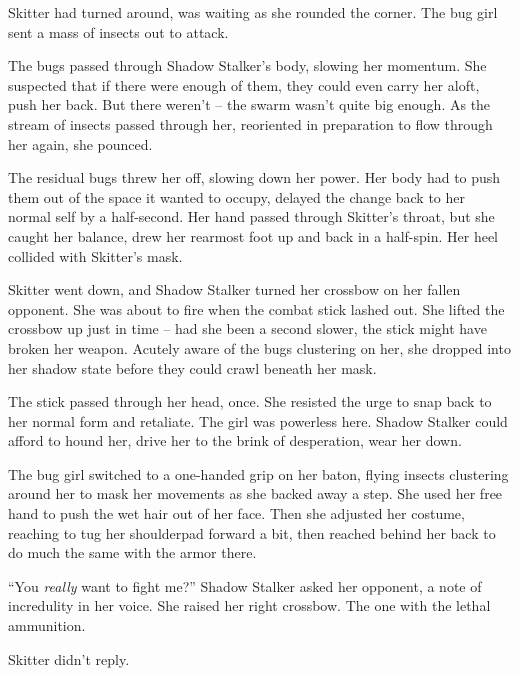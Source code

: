 Skitter had turned around, was waiting as she rounded the corner.  The bug girl sent a mass of insects out to attack.



The bugs passed through Shadow Stalker's body, slowing her momentum.  She suspected that if there were enough of them, they could even carry her aloft, push her back.  But there weren't – the swarm wasn't quite big enough.  As the stream of insects passed through her, reoriented in preparation to flow through her again, she pounced.



The residual bugs threw her off, slowing down her power.  Her body had to push them out of the space it wanted to occupy, delayed the change back to her normal self by a half-second.  Her hand passed through Skitter's throat, but she caught her balance, drew her rearmost foot up and back in a half-spin.  Her heel collided with Skitter's mask.



Skitter went down, and Shadow Stalker turned her crossbow on her fallen opponent.  She was about to fire when the combat stick lashed out.  She lifted the crossbow up just in time –  had she been a second slower, the stick might have broken her weapon.  Acutely aware of the bugs clustering on her, she dropped into her shadow state before they could crawl beneath her mask.



The stick passed through her head, once.  She resisted the urge to snap back to her normal form and retaliate.  The girl was powerless here.  Shadow Stalker could afford to hound her, drive her to the brink of desperation, wear her down.



The bug girl switched to a one-handed grip on her baton, flying insects clustering around her to mask her movements as she backed away a step.  She used her free hand to push the wet hair out of her face.  Then she adjusted her costume, reaching to tug her shoulderpad forward a bit, then reached behind her back to do much the same with the armor there.



``You \emph{really} want to fight me?'' Shadow Stalker asked her opponent, a note of incredulity in her voice.  She raised her right crossbow.  The one with the lethal ammunition.



Skitter didn't reply.



